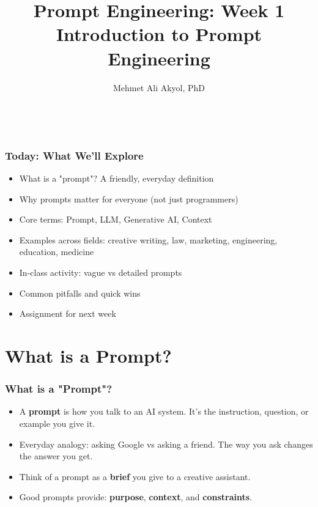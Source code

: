 \documentclass[11pt]{beamer}
\title[Week 1]{Prompt Engineering: Week 1\\Introduction to Prompt Engineering}
\author{Mehmet Ali Akyol, PhD}
\institute{Ankara Medipol University}
\date{\\}
\begin{document}
\begin{frame}
  \titlepage
\end{frame}

\begin{frame}
  \frametitle{Today: What We'll Explore}
  \begin{itemize}
    \item What is a "prompt"? A friendly, everyday definition
    \item Why prompts matter for everyone (not just programmers)
    \item Core terms: Prompt, LLM, Generative AI, Context
    \item Examples across fields: creative writing, law, marketing, engineering, education, medicine
    \item In-class activity: vague vs detailed prompts
    \item Common pitfalls and quick wins
    \item Assignment for next week
  \end{itemize}
\end{frame}

\section{What is a Prompt?}
\begin{frame}
  \frametitle{What is a "Prompt"?}
  \begin{itemize}
    \item A \textbf{prompt} is how you talk to an AI system. It's the instruction, question, or example you give it.
    \item Everyday analogy: asking Google vs asking a friend. The way you ask changes the answer you get.
    \item Think of a prompt as a \textbf{brief} you give to a creative assistant.
    \item Good prompts provide: \textbf{purpose}, \textbf{context}, and \textbf{constraints}.
  \end{itemize}
\end{frame}
\end{document}
